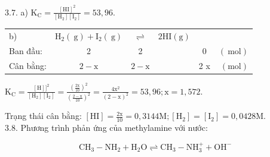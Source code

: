 \documentclass[10pt]{article}
\begin{document}
3.7. a) $\mathrm{K}_{\mathrm{C}}=\frac{[\mathrm{HI}]^{2}}{\left[\mathrm{H}_{2}\right]\left[\mathrm{I}_{2}\right]}=53,96$.

\begin{center}
\begin{tabular}{lccccr}
b) & $\mathrm{H}_{2}(\mathrm{~g})+\mathrm{I}_{2}(\mathrm{~g})$ & $\rightleftharpoons$ & $2 \mathrm{HI}(\mathrm{g})$ &  &  \\
Ban đầu: & 2 & 2 &  & 0 & $(\mathrm{~mol})$ \\
Cân bằng: & $2-\mathrm{x}$ & $2-\mathrm{x}$ &  & 2 x & $(\mathrm{mol})$ \\
\end{tabular}
\end{center}

$\mathrm{K}_{\mathrm{C}}=\frac{[\mathrm{H}]]^{2}}{\left[\mathrm{H}_{2}\right]\left[\mathrm{I}_{2}\right]}=\frac{\left(\frac{2 \mathrm{x}}{10}\right)^{2}}{\left(\frac{2-\mathrm{x}}{10}\right)^{2}}=\frac{4 \mathrm{x}^{2}}{(2-\mathrm{x})^{2}}=53,96 ; \mathrm{x}=1,572$.

Trạng thái cân bằng: $[\mathrm{HI}]=\frac{2 \mathrm{x}}{10}=0,3144 \mathrm{M} ;\left[\mathrm{H}_{2}\right]=\left[\mathrm{I}_{2}\right]=0,0428 \mathrm{M}$.\\
3.8. Phương trình phản ứng của methylamine với nước:

$$
\mathrm{CH}_{3}-\mathrm{NH}_{2}+\mathrm{H}_{2} \mathrm{O} \rightleftharpoons \mathrm{CH}_{3}-\mathrm{NH}_{3}^{+}+\mathrm{OH}^{-}
$$
\end{document}
